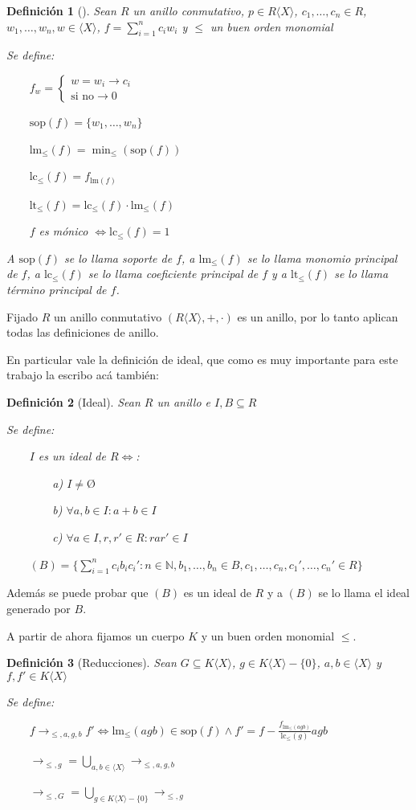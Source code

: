 \documentclass{amsbook}
\theoremstyle{customstyle}
\newtheorem{definition}{Definición}[section]
\newcommand{\definición}[2][]{
  \begin{definition}[#1]
  \setlength{\parindent}{2em} %
  #2
  \end{definition}
}
\begin{document}
\definición[] {
Sean $R$ un anillo conmutativo, $p ∈ R⟨X⟩$, $c_1, …, c_n ∈ R$, $w_1, …, w_n, w ∈ ⟨X⟩$, $f = \sum_{i = 1}^n c_i w_i$ y $≤$ un buen orden monomial

Se define:

    $f_w = \left\{\begin{array}{ll} w = w_i → c_i \\ \text{si no} → 0  \end{array} \right. $

    $\text{sop}(f) = \{w_1, …, w_n\}$

    $\text{lm}_≤(f) = \min_≤(\text{sop}(f))$

    $\text{lc}_≤(f) = f_{\text{lm}(f)}$

    $\text{lt}_≤(f) = \text{lc}_≤(f) · \text{lm}_≤(f)$

    $f$ es mónico $⇔ \text{lc}_≤(f) = 1$

A $\text{sop}(f)$ se lo llama soporte de $f$, a $\text{lm}_≤(f)$ se lo llama monomio principal de $f$, a $\text{lc}_≤(f)$ se lo llama coeficiente principal de $f$ y a $\text{lt}_≤(f)$ se lo llama término principal de $f$.

}

Fijado $R$ un anillo conmutativo $(R⟨X⟩, +, ·)$ es un anillo, por lo tanto aplican todas las definiciones de anillo.

En particular vale la definición de ideal, que como es muy importante para este trabajo la escribo acá también:

\definición[Ideal] {
Sean $R$ un anillo e $I, B ⊆ R$

Se define:

    $I$ es un ideal de $R ⇔$:

        a) $I ≠ Ø$

        b) $∀a, b ∈ I : a + b ∈ I$

        c) $∀a ∈ I, r, r' ∈ R : rar' ∈ I$

    $(B) = \{\sum_{i = 1}^n c_i b_i c_i' : n ∈ ℕ, b_1, …, b_n ∈ B, c_1, …, c_n, c_1', …, c_n' ∈ R\}$
}

Además se puede probar que $(B)$ es un ideal de $R$ y a $(B)$ se lo llama el ideal generado por $B$.

A partir de ahora fijamos un cuerpo $K$ y un buen orden monomial $≤$.

\definición[Reducciones] {
Sean $G ⊆ K⟨X⟩$, $g ∈ K⟨X⟩ - \{0\}$, $a, b ∈ ⟨X⟩$ y $f, f' ∈ K⟨X⟩$

Se define:

    $f →_{≤, a, g, b} f' ⇔ \text{lm}_≤(agb) ∈ \text{sop}(f) ∧ f' = f - \frac{f_{\text{lm}_≤(agb)}}{\text{lc}_≤(g)}agb$

    $→_{≤, g} = \bigcup_{a, b ∈ ⟨X⟩} →_{≤, a, g, b}$

    $→_{≤, G} = \bigcup_{g ∈ K⟨X⟩ - \{0\}} →_{≤, g}$
}
\end{document}
